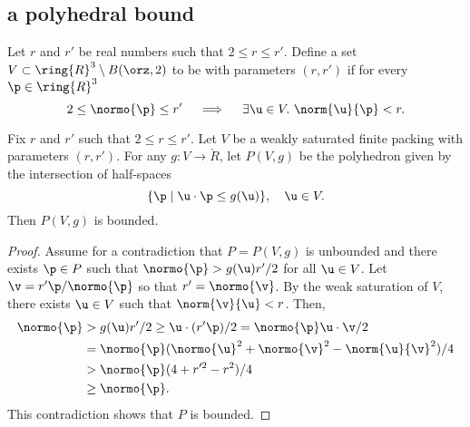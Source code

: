 


\subsection{a polyhedral bound}

\begin{definition} 
\label{def:weakly-saturated}
Let $r$ and $r'$ be real numbers such that $2\le r\le r'$.  Define a
set $ V\subset\ring{R}^3\setminus B(\orz,2)$ to be  with
parameters $(r,r')$ if for every $\p\in\ring{R}^3$
\[  
2\le\normo{\p}\le r'~~~\implies~~~ \exists \u\in V.~\norm{ \u}{\p}< r.
\] 
\end{definition}

\begin{lemma}[]\label{lemma:poly-bounded} 
Fix $r$ and $r'$ such that $2\le r\le r'$.
Let $ V$ be a weakly saturated finite packing with parameters $(r,r')$.
For any $g: V\to\ring{R}$, let $P( V,g)$ be the
polyhedron given by the intersection of half-spaces
\[  
\{\p \mid  \u\cdot \p \le g( \u)\},\quad \u\in V.
\] 
Then $P( V,g)$ is bounded.
\end{lemma}
%

\begin{proof} Assume for a contradiction that $P=P( V,g)$ is
  unbounded and there exists $\p\in P$ such that $\normo{\p} > g( \u)
  r'/2$ for all $ \u\in V$.  Let $\v = r' \p/\normo{\p}$ so that
  $r'=\normo{\v}$.  By the weak saturation of $ V$, there exists $
  \u\in V$ such that $\norm{\v}{ \u}<r$.  Then,
\begin{align*} 
\normo{\p} &> g( \u) r'/2 \ge  \u\cdot (r' \p)/2 = \normo{\p}  \u\cdot \v /2\\
&= \normo{\p} (\normo{ \u}^2 + \normo{\v}^2 - \norm{ \u}{\v}^2)/4\\
&> \normo{\p}(4+r'^2-r^2)/4\\
&\ge \normo{\p}.
\end{align*}
This contradiction shows that $P$ is bounded.
\end{proof}




